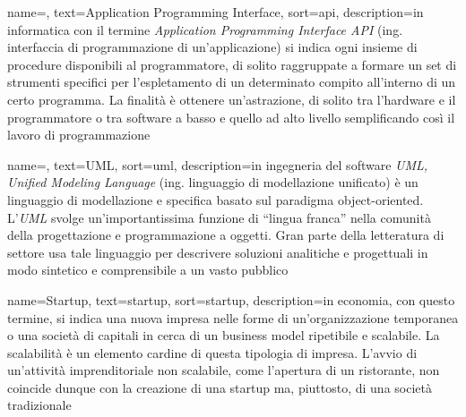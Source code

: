 
\renewcommand{\acronymname}{Acronimi e abbreviazioni}


		
		


{
    name=,
    text=Application Programming Interface,
    sort=api,
    description={in informatica con il termine \emph{Application Programming Interface API} (ing. interfaccia di programmazione di un'applicazione) si indica ogni insieme di procedure disponibili al programmatore, di solito raggruppate a formare un set di strumenti specifici per l'espletamento di un determinato compito all'interno di un certo programma. La finalità è ottenere un'astrazione, di solito tra l'hardware e il programmatore o tra software a basso e quello ad alto livello semplificando così il lavoro di programmazione}
}

{
    name=,
    text=UML,
    sort=uml,
    description={in ingegneria del software \emph{UML, Unified Modeling Language} (ing. linguaggio di modellazione unificato) è un linguaggio di modellazione e specifica basato sul paradigma object-oriented. L'\emph{UML} svolge un'importantissima funzione di ``lingua franca'' nella comunità della progettazione e programmazione a oggetti. Gran parte della letteratura di settore usa tale linguaggio per descrivere soluzioni analitiche e progettuali in modo sintetico e comprensibile a un vasto pubblico}
}

{
    name=Startup,
    text=startup,
    sort=startup,
    description={in economia, con questo termine, si indica una nuova impresa nelle forme di un'organizzazione temporanea o una società di capitali in cerca di un business model ripetibile e scalabile.
La scalabilità è un elemento cardine di questa tipologia di impresa. L'avvio di un'attività imprenditoriale non scalabile, come l'apertura di un ristorante, non coincide dunque con la creazione di una startup ma, piuttosto, di una società tradizionale}
}

